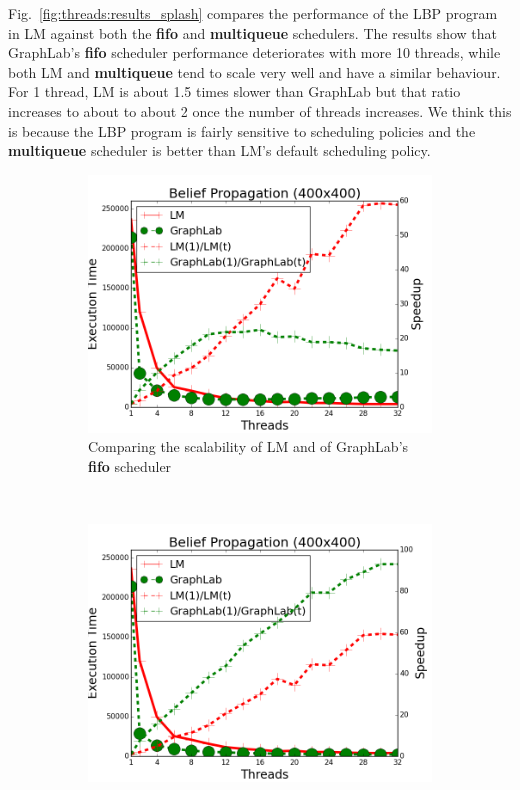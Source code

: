 Fig.~\ref{fig:threads:results_splash} compares the performance of the LBP
program in LM against both the \textbf{fifo} and \textbf{multiqueue} schedulers.
The results show that GraphLab's \textbf{fifo} scheduler performance
deteriorates with more 10 threads, while both LM and \textbf{multiqueue} tend to
scale very well and have a similar behaviour. For 1 thread, LM is about 1.5
times slower than GraphLab but that ratio increases to about to about 2 once the
number of threads increases. We think this is because the LBP program is fairly
sensitive to scheduling policies and the \textbf{multiqueue} scheduler is
better than LM's default scheduling policy.

\begin{figure}[]
        \centering
        \begin{subfigure}[b]{\plotsize\textwidth}
           \includegraphics[width=\textwidth]{experiments/threads/cmp-fifo-belief-propagation-400.png}
           \caption{Comparing the scalability of LM and of GraphLab's
              \textbf{fifo} scheduler}
           \label{fig:threads:splash_fifo}
        \end{subfigure}
        ~ ~
        \begin{subfigure}[b]{\plotsize\textwidth}
           \includegraphics[width=\textwidth]{experiments/threads/cmp-multi-belief-propagation-400.png}

\end{subfigure}
\end{figure}
